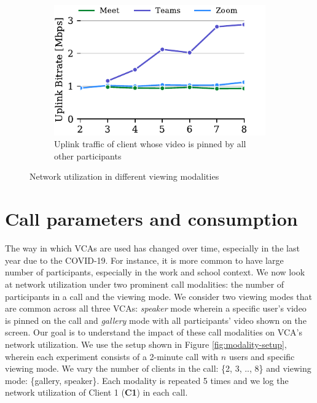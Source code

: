 \begin{figure}[ht]
\begin{subfigure}[t]{.33\textwidth}
    \includegraphics[width=1\textwidth,keepaspectratio]{../figures/modality/speaker_send.pdf}
    \caption{Uplink traffic of client whose video is pinned by all other participants}
    \label{fig:speaker-send}
\end{subfigure}
\caption{Network utilization in different viewing modalities}
\label{fig:viewing-mode}
\end{figure}

\section{Call parameters and 
consumption}\label{sec:usage_modality}






The way in which VCAs are used has changed over time, especially in the last year due to the COVID-19. For instance, it is more common to have large number of participants, especially in the work and school context. We now look at network utilization under two prominent call modalities: the number of participants in a call and the viewing mode. We consider two viewing modes that are common across all three VCAs: \textit{speaker} mode wherein a specific user's video is pinned on the call and \textit{gallery} mode with all participants' video shown on the screen. Our goal is to understand the impact of these call modalities on VCA's network utilization. We use the setup shown in Figure \ref{fig:modality-setup}, wherein each experiment consists of a 2-minute call with $n$ users and specific viewing mode. We vary the number of clients in the call: \{2, 3, .., 8\} and viewing mode: \{gallery, speaker\}. Each modality is repeated 5 times and we log the network utilization of Client 1 (\textbf{C1}) in each call. 

